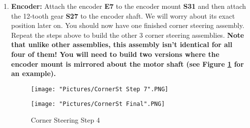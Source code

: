 \documentclass[12pt]{article}
\begin{document}
\begin{enumerate}
\item \textbf{Encoder:} Attach the encoder \textbf{E7} to the encoder mount \textbf{S31} and then attach the 12-tooth gear \textbf{S27} to the encoder shaft. We will worry about its exact position later on. You should now have one finished corner steering assembly. Repeat the steps above to build the other 3 corner steering assemblies. \textbf{Note that unlike other assemblies, this assembly isn't identical for all four of them! You will need to build two versions where the encoder mount is mirrored about the motor shaft (see Figure \ref{corner steering 4} for an example).}

\begin{figure}[H]
  \centering
  \begin{minipage}[b]{0.45\textwidth}
    \texttt{[image: "Pictures/CornerSt Step 7".PNG]}
  \end{minipage}
  \hfill
  \begin{minipage}[b]{0.45\textwidth}
    \texttt{[image: "Pictures/CornerSt Final".PNG]}
  \end{minipage}
  \caption{Corner Steering Step 4}
  \label{corner steering 4}
\end{figure}

\end{enumerate}
\end{document}
